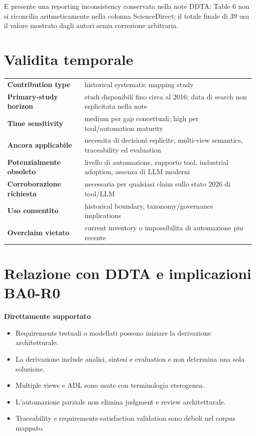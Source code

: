 \documentclass[10.5pt,a4paper]{article}
\begin{document}
E presente una reporting inconsistency conservata nella note DDTA: Table 6 non si riconcilia aritmeticamente nella colonna ScienceDirect; il totale finale di 39 usa il valore mostrato dagli autori senza correzione arbitraria.

\section{Validita temporale}
\begin{tabularx}{\linewidth}{>{\bfseries}p{4.1cm}X}
Contribution type & historical systematic mapping study\\
Primary-study horizon & studi disponibili fino circa al 2016; data di search non esplicitata nella note\\
Time sensitivity & medium per gap concettuali; high per tool/automation maturity\\
Ancora applicabile & necessita di decisioni esplicite, multi-view semantics, traceability ed evaluation\\
Potenzialmente obsoleto & livello di automazione, supporto tool, industrial adoption, assenza di LLM moderni\\
Corroborazione richiesta & necessaria per qualsiasi claim sullo stato 2026 di tool/LLM\\
Uso consentito & historical boundary, taxonomy/governance implications\\
Overclaim vietato & current inventory o impossibilita di automazione piu recente\\
\end{tabularx}

\section{Relazione con DDTA e implicazioni BA0-R0}
\textbf{Direttamente supportato}
\begin{itemize}
\item Requirements testuali o modellati possono iniziare la derivazione architetturale.
\item La derivazione include analisi, sintesi e evaluation e non determina una sola soluzione.
\item Multiple views e ADL sono usate con terminologia eterogenea.
\item L'automazione parziale non elimina judgment e review architetturale.
\item Traceability e requirements-satisfaction validation sono deboli nel corpus mappato.
\end{itemize}
\end{document}
